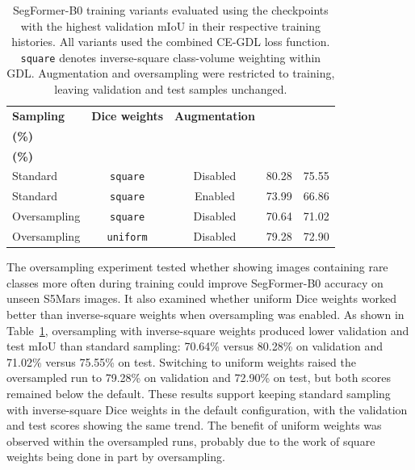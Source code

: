 \begin{table}[ht!]
    \centering
    \small
    \setlength{\tabcolsep}{5pt}
    \begin{tabular}{@{}l c c r r@{}}
        \toprule
        \textbf{Sampling}                              & \textbf{Dice weights} & \textbf{Augmentation} &
        \shortstack{\textbf{Val. mIoU}\\\textbf{(\%)}} &
        \shortstack{\textbf{Test mIoU}\\\textbf{(\%)}}                                                                 \\
        \midrule
        \midrule
        Standard                                       & \texttt{square}       & Disabled              & 80.28 & 75.55 \\
        Standard                                       & \texttt{square}       & Enabled               & 73.99 & 66.86 \\
        Oversampling                                   & \texttt{square}       & Disabled              & 70.64 & 71.02 \\
        Oversampling                                   & \texttt{uniform}      & Disabled              & 79.28 & 72.90 \\
        \bottomrule
    \end{tabular}
    \vspace{5mm}
    \caption{SegFormer-B0 training variants evaluated using the checkpoints with the highest validation mIoU in their respective training histories. All variants used the combined CE-GDL loss function. \texttt{square} denotes inverse-square class-volume weighting within GDL. Augmentation and oversampling were restricted to training, leaving validation and test samples unchanged.}
    \label{tab:s5mars-segformer-training-ablation}
\end{table}
The oversampling experiment tested whether showing images containing rare classes more often during training could improve SegFormer-B0 accuracy on unseen S5Mars images. It also examined whether uniform Dice weights worked better than inverse-square weights when oversampling was enabled. As shown in Table~\ref{tab:s5mars-segformer-training-ablation}, oversampling with inverse-square weights produced lower validation and test mIoU than standard sampling: 70.64\% versus 80.28\% on validation and 71.02\% versus 75.55\% on test. Switching to uniform weights raised the oversampled run to 79.28\% on validation and 72.90\% on test, but both scores remained below the default. These results support keeping standard sampling with inverse-square Dice weights in the default configuration, with the validation and test scores showing the same trend. The benefit of uniform weights was observed within the oversampled runs, probably due to the work of square weights being done in part by oversampling.

